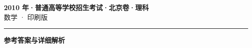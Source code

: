\documentclass[zihao=5, a4paper]{ctexart}
\begin{document}
\begin{center}
  {\Large\bfseries 2010 年·普通高等学校招生考试·北京卷·理科}\\[4pt]
  {\large 数学 · 印刷版}
\end{center}
\medskip
{}

\par\bigskip\hrule\bigskip
{}
\begin{center}{\large\bfseries 参考答案与详细解析}\end{center}
\smallskip

\end{document}
